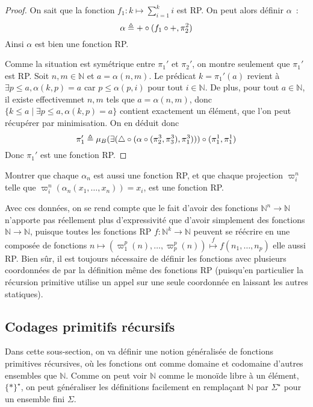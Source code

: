 \begin{proof}
  On sait que la fonction $f_1 : k \mapsto \sum_{i = 1}^k i$ est RP. On peut
  alors définir $\alpha$~:
  \[\alpha \triangleq + \circ (f_1\circ +,\pi_2^2)\]
  Ainsi $\alpha$ est bien une fonction RP.

  Comme la situation est symétrique entre $\pi_1'$ et $\pi_2'$, on montre
  seulement que $\pi_1'$ est RP. Soit $n,m\in \mathbb N$ et $a = \alpha(n,m)$.
  Le prédicat $k = \pi_1'(a)$ revient à $\exists p \leq a,\alpha(k,p) = a$ car
  $p \leq \alpha(p,i)$ pour tout $i\in\mathbb N$. De plus, pour tout
  $a\in \mathbb N$, il existe effectivemnet $n,m$ tels que $a = \alpha(n,m)$,
  donc $\{k \leq a \mid \exists p\leq a, \alpha(k,p) = a\}$
  contient exactement un élément, que l'on peut récupérer par minimisation.
  On en déduit donc
  \[\pi_1' \triangleq \mu_B (\exists(\triangle\circ
  (\alpha\circ (\pi_2^3,\pi_3^3), \pi_1^3)))\circ (\pi_1^1,\pi_1^1)\]
  Donc $\pi_1'$ est une fonction RP.
\end{proof}

\begin{exercise}
  Montrer que chaque $\alpha_n$ est aussi une fonction RP, et que chaque
  projection $\varpi_i^n$ telle que $\varpi_i^n(\alpha_n(x_1,\ldots,x_n)) = x_i$,
  est une fonction RP.
\end{exercise}

Avec ces données, on se rend compte que le fait d'avoir des fonctions
$\mathbb N^n \to \mathbb N$ n'apporte pas réellement plus d'expressivité que
d'avoir simplement des fonctions $\mathbb N \to \mathbb N$, puisque toutes les
fonctions RP $f : \mathbb N^k \to \mathbb N$ peuvent se réécrire en une
composée de fonctions
$n \mapsto (\varpi_1^p(n),\ldots,\varpi_p^p(n))
\overset{f}{\mapsto} f(n_1,\ldots,n_p)$ elle aussi
RP. Bien sûr, il est toujours nécessaire de définir les fonctions avec plusieurs
coordonnées de par la définition même des fonctions RP (puisqu'en particulier
la récursion primitive utilise un appel sur une seule coordonnée en laissant les
autres statiques).

\subsection{Codages primitifs récursifs}

Dans cette sous-section, on va définir une notion généralisée de fonctions
primitives récursives, où les fonctions ont comme domaine et codomaine d'autres
ensembles que $\mathbb N$. Comme on peut voir $\mathbb N$ comme le monoïde libre
à un élément, $\{*\}^\star$, on peut généraliser les définitions facilement en
remplaçant $\mathbb N$ par $\Sigma^\star$ pour un ensemble fini $\Sigma$.

